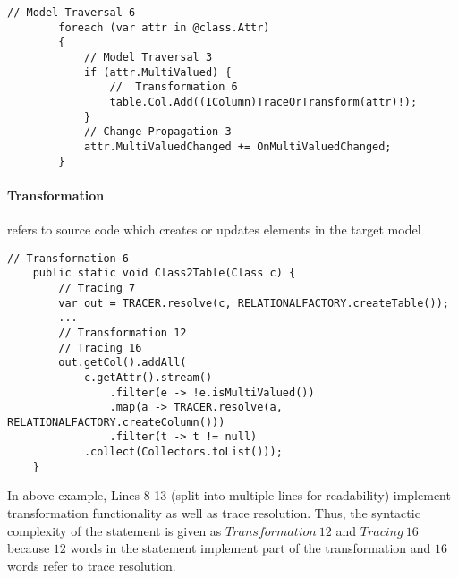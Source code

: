 \documentclass{article}
\begin{document}
        \begin{lstlisting}[language=myJava]
        // Model Traversal 6 
        foreach (var attr in @class.Attr)
        {
            // Model Traversal 3
            if (attr.MultiValued) {
                //  Transformation 6
                table.Col.Add((IColumn)TraceOrTransform(attr)!);
            }
            // Change Propagation 3
            attr.MultiValuedChanged += OnMultiValuedChanged;
        }
        \end{lstlisting}
        
        \paragraph{Transformation} refers to source code which creates or updates elements in the target model 

    \begin{lstlisting}[language=myJava]
    // Transformation 6
    public static void Class2Table(Class c) {
        // Tracing 7
        var out = TRACER.resolve(c, RELATIONALFACTORY.createTable());
        ...
        // Transformation 12
        // Tracing 16
        out.getCol().addAll( 
            c.getAttr().stream()
                .filter(e -> !e.isMultiValued())
                .map(a -> TRACER.resolve(a, RELATIONALFACTORY.createColumn()))
                .filter(t -> t != null)
            .collect(Collectors.toList())); 
    }
    \end{lstlisting}
    In above example, Lines 8-13 %
(split into multiple lines for readability) implement transformation functionality as well as trace resolution.
Thus, the syntactic complexity of the statement is given as $Transformation~12$ and $Tracing~16$ because $12$ words in the statement implement part of the transformation and $16$ words refer to trace resolution.
\end{document}

